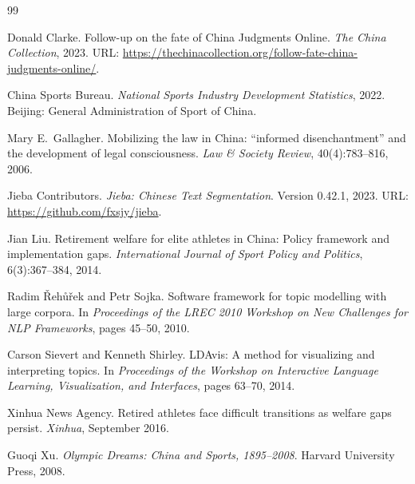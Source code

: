\documentclass[10pt,letterpaper]{article}
\begin{document}

\begin{thebibliography}{99}

Donald Clarke.
\newblock Follow-up on the fate of China Judgments Online.
\newblock \textit{The China Collection}, 2023.
\newblock URL: \url{https://thechinacollection.org/follow-fate-china-judgments-online/}.

China Sports Bureau.
\newblock \textit{National Sports Industry Development Statistics}, 2022.
\newblock Beijing: General Administration of Sport of China.

Mary E.~Gallagher.
\newblock Mobilizing the law in China: ``informed disenchantment'' and the development of legal consciousness.
\newblock \textit{Law \& Society Review}, 40(4):783--816, 2006.

{Jieba Contributors}.
\newblock \textit{Jieba: Chinese Text Segmentation}.
\newblock Version 0.42.1, 2023.
\newblock URL: \url{https://github.com/fxsjy/jieba}.

Jian Liu.
\newblock Retirement welfare for elite athletes in China: Policy framework and implementation gaps.
\newblock \textit{International Journal of Sport Policy and Politics}, 6(3):367--384, 2014.

Radim {\v{R}}eh{\r{u}}{\v{r}}ek and Petr Sojka.
\newblock Software framework for topic modelling with large corpora.
\newblock In \textit{Proceedings of the LREC 2010 Workshop on New Challenges for NLP Frameworks}, pages 45--50, 2010.

Carson Sievert and Kenneth Shirley.
\newblock LDAvis: A method for visualizing and interpreting topics.
\newblock In \textit{Proceedings of the Workshop on Interactive Language Learning, Visualization, and Interfaces}, pages 63--70, 2014.

Xinhua News Agency.
\newblock Retired athletes face difficult transitions as welfare gaps persist.
\newblock \textit{Xinhua}, September 2016.

Guoqi Xu.
\newblock \textit{Olympic Dreams: China and Sports, 1895--2008}.
\newblock Harvard University Press, 2008.

\end{thebibliography}
\end{document}
